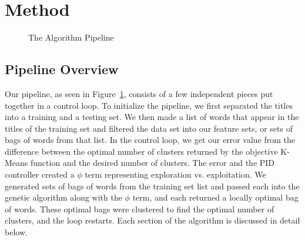 \documentclass{sig-alternate}
\begin{document}
\section{Method}
\begin{figure}[t]
\centering
{}
\caption{The Algorithm Pipeline}
\label{fig:pipeline}
\end{figure}
\subsection{Pipeline Overview}
Our pipeline, as seen in Figure~\ref{fig:pipeline}, consists of a few independent pieces put together in a control loop. To initialize the pipeline, we first separated the titles into a training and a testing set. We then made a list of words that appear in the titles of the training set and filtered the data set into our feature sets, or sets of bags of words from that list. In the control loop, we get our error value from the difference between the optimal number of clusters returned by the objective K-Means function and the desired number of clusters. The error and the PID controller created a $\phi$ term representing exploration vs. exploitation. We generated sets of bags of words from the training set list and passed each into the genetic algorithm along with the $\phi$ term, and each returned a locally optimal bag of words. These optimal bags were clustered to find the optimal number of clusters, and the loop restarts. Each section of the algorithm is discussed in detail below.
\end{document}
